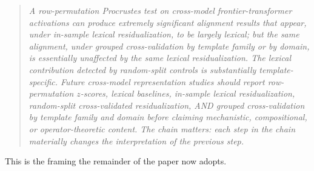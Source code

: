 \begin{quote}
\emph{A row-permutation Procrustes test on cross-model frontier-transformer
activations can produce extremely significant alignment results that
appear, under in-sample lexical residualization, to be largely lexical;
but the same alignment, under grouped cross-validation by template
family or by domain, is essentially unaffected by the same lexical
residualization. The lexical contribution detected by random-split
controls is substantially template-specific. Future cross-model
representation studies should report row-permutation $z$-scores,
lexical baselines, in-sample lexical residualization, random-split
cross-validated residualization, AND grouped cross-validation by
template family and domain before claiming mechanistic, compositional,
or operator-theoretic content. The chain matters: each step in the
chain materially changes the interpretation of the previous step.}
\end{quote}

This is the framing the remainder of the paper now adopts.
